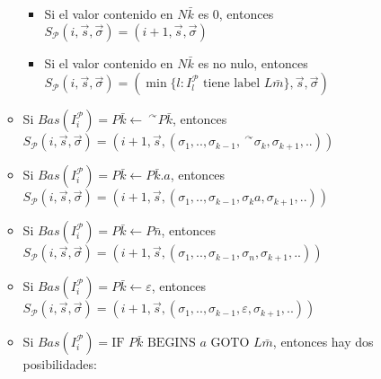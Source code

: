 \documentclass[
]{article}
\providecommand{\tightlist}{%
  \setlength{\itemsep}{0pt}\setlength{\parskip}{0pt}}
\begin{document}
\begin{enumerate}
\begin{itemize}
    \begin{itemize}
    \tightlist
    \item
      Si el valor contenido en \(N\bar{k}\) es \(0\), entonces
      \(S_\mathcal{P}(i,\vec{s},\vec{\sigma})=(i+1,\vec{s},\vec{\sigma})\)
    \item
      Si el valor contenido en \(N\bar{k}\) es no nulo, entonces
      \(S_\mathcal{P}(i,\vec{s},\vec{\sigma})=(\min\{l:I_l^\mathcal{P}\text{ tiene label }L\bar{m}\},\vec{s},\vec{\sigma})\)
    \end{itemize}
  \item
    Si
    \(Bas(I_i^\mathcal{P})=P\bar{k}\leftarrow\ ^\curvearrowright P\bar{k}\),
    entonces
    \(S_\mathcal{P}(i,\vec{s},\vec{\sigma})=(i+1,\vec{s},(\sigma_1,..,\sigma_{k-1},\ ^\curvearrowright\sigma_k,\sigma_{k+1},..))\)
  \item
    Si \(Bas(I_i^\mathcal{P})=P\bar{k}\leftarrow P\bar{k}.a\), entonces
    \(S_\mathcal{P}(i,\vec{s},\vec{\sigma})=(i+1,\vec{s},(\sigma_1,..,\sigma_{k-1},\sigma_k a,\sigma_{k+1},..))\)
  \item
    Si \(Bas(I_i^\mathcal{P})=P\bar{k}\leftarrow P\bar{n}\), entonces
    \(S_\mathcal{P}(i,\vec{s},\vec{\sigma})=(i+1,\vec{s},(\sigma_1,..,\sigma_{k-1},\sigma_n,\sigma_{k+1},..))\)
  \item
    Si \(Bas(I_i^\mathcal{P})=P\bar{k}\leftarrow\varepsilon\), entonces
    \(S_\mathcal{P}(i,\vec{s},\vec{\sigma})=(i+1,\vec{s},(\sigma_1,..,\sigma_{k-1},\varepsilon,\sigma_{k+1},..))\)
  \item
    Si
    \(Bas(I_i^\mathcal{P})=\text{IF }P\bar{k}\text{ BEGINS }a\text{ GOTO }L\bar{m}\),
    entonces hay dos posibilidades:


\end{itemize}
\end{enumerate}
\end{document}
